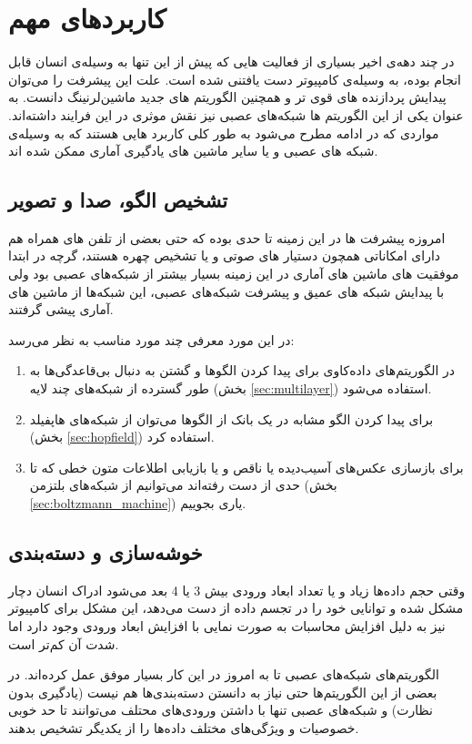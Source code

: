 \documentclass[11pt,a4paper,twocolumn]{article}
\begin{document}
\section{کاربرد‌های مهم}
در چند دهه‌ی اخیر بسیاری از فعالیت هایی که پیش از این تنها به وسیله‌ی انسان قابل انجام بوده، به وسیله‌ی کامپیوتر دست یافتنی شده است. علت این پیشرفت را می‌توان پیدایش پردازنده های قوی تر و همچنین الگوریتم های جدید ماشین‌لرنینگ  دانست.
به عنوان یکی از این الگوریتم ها شبکه‌های عصبی نیز نقش موثری در این فرایند داشته‌اند. مواردی که در ادامه مطرح می‌شود به طور کلی کاربرد هایی هستند که به وسیله‌ی شبکه های عصبی و یا سایر ماشین های یادگیری آماری ممکن شده اند.
\subsection{تشخیص الگو، صدا و تصویر}
امروزه پیشرفت ها در این زمینه تا حدی بوده که حتی بعضی از تلفن های همراه هم دارای امکاناتی همچون دستیار های صوتی و یا تشخیص چهره هستند، گرچه در ابتدا موفقیت های ماشین های آماری در این زمینه بسیار بیشتر از شبکه‌های عصبی بود ولی با پیدایش شبکه های عمیق و پیشرفت شبکه‌های عصبی، این شبکه‌ها از ماشین های آماری پیشی گرفتند.

در این مورد معرفی چند مورد مناسب به نظر می‌رسد:
\begin{enumerate}
\item
در الگوریتم‌های داده‌کاوی برای پیدا کردن الگوها و گشتن به دنبال بی‌قاعدگی‌ها به طور گسترده از شبکه‌های چند لایه (بخش
\ref{sec:multilayer})
استفاده می‌شود.
\item
برای پیدا کردن الگو مشابه در یک بانک از الگو‌ها می‌توان از شبکه‌های هاپفیلد (بخش 
\ref{sec:hopfield})
استفاده کرد.
\item
برای بازسازی عکس‌های آسیب‌دیده یا ناقص و یا بازیابی اطلاعات متون خطی که تا حدی از دست رفته‌اند می‌توانیم از شبکه‌های بلتزمن (بخش 
\ref{sec:boltzmann_machine})
یاری بجوییم.

\end{enumerate}

\subsection{خوشه‌سازی و دسته‌بندی}
وقتی حجم داده‌ها زیاد و یا تعداد ابعاد ورودی بیش 3 یا 4 بعد می‌شود ادراک انسان دچار مشکل شده و توانایی خود را در تجسم داده از دست می‌دهد، این مشکل برای کامپیوتر نیز به دلیل افزایش محاسبات به صورت نمایی با افزایش ابعاد ورودی وجود دارد اما شدت آن کم‌تر است.

الگوریتم‌های شبکه‌های عصبی تا به امروز در این کار بسیار موفق عمل کرده‌اند. در بعضی از این الگوریتم‌ها حتی نیاز به دانستن دسته‌بندی‌ها هم نیست (یادگیری بدون نظارت) و شبکه‌های عصبی تنها با داشتن ورودی‌های محتلف می‌توانند تا حد خوبی خصوصیات و ویژگی‌های مختلف داده‌ها را از یکدیگر تشخیص بدهند.
\end{document}
